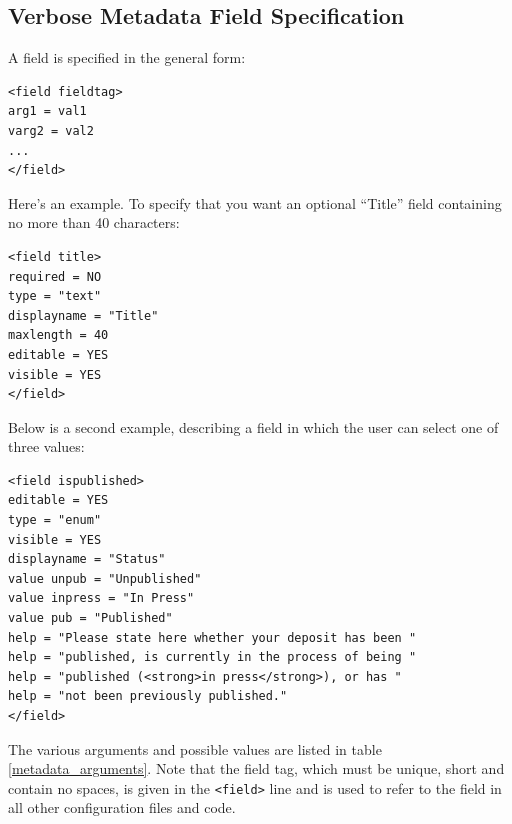 \subsection{Verbose Metadata Field Specification}

A field is specified in the general form:

\begin{verbatim}
<field fieldtag>
arg1 = val1
varg2 = val2
...
</field>
\end{verbatim}

Here's an example. To specify that you want an optional ``Title'' field containing no more than 40 characters:

\begin{verbatim}
<field title>
required = NO
type = "text"
displayname = "Title"
maxlength = 40
editable = YES
visible = YES
</field>
\end{verbatim}

Below is a second example, describing a field in which the user can select one of three values:

\begin{verbatim}
<field ispublished>
editable = YES
type = "enum"
visible = YES
displayname = "Status"
value unpub = "Unpublished"
value inpress = "In Press"
value pub = "Published"
help = "Please state here whether your deposit has been "
help = "published, is currently in the process of being "
help = "published (<strong>in press</strong>), or has "
help = "not been previously published."
</field>
\end{verbatim}

The various arguments and possible values are listed in table \ref{metadata_arguments}. Note that the field tag, which must be unique, short and contain no spaces, is given in the {\tt <field>} line and is used to refer to the field in all other configuration files and code.

